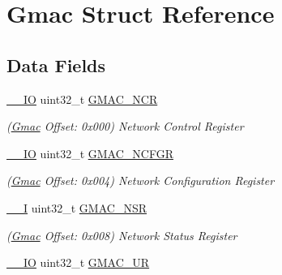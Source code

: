 \hypertarget{structGmac}{}\section{Gmac Struct Reference}
\label{structGmac}
\subsection*{Data Fields}
\begin{DoxyCompactItemize}
\item 
\mbox{\label{structGmac_af7956c00f79851e10a1012e6ebae02ec}} 
\mbox{\hyperlink{core__cm7_8h_aec43007d9998a0a0e01faede4133d6be}{\+\_\+\+\_\+\+IO}} uint32\+\_\+t \mbox{\hyperlink{structGmac_af7956c00f79851e10a1012e6ebae02ec}{G\+M\+A\+C\+\_\+\+N\+CR}}
\begin{DoxyCompactList}\small\item\em (\mbox{\hyperlink{structGmac}{Gmac}} Offset\+: 0x000) Network Control Register \end{DoxyCompactList}\item 
\mbox{\label{structGmac_a875e9ccd4b9608db23678b6bfaa70ade}} 
\mbox{\hyperlink{core__cm7_8h_aec43007d9998a0a0e01faede4133d6be}{\+\_\+\+\_\+\+IO}} uint32\+\_\+t \mbox{\hyperlink{structGmac_a875e9ccd4b9608db23678b6bfaa70ade}{G\+M\+A\+C\+\_\+\+N\+C\+F\+GR}}
\begin{DoxyCompactList}\small\item\em (\mbox{\hyperlink{structGmac}{Gmac}} Offset\+: 0x004) Network Configuration Register \end{DoxyCompactList}\item 
\mbox{\label{structGmac_a0354dce4f587ce5ad8b8ab5d0f3d16b8}} 
\mbox{\hyperlink{core__cm7_8h_af63697ed9952cc71e1225efe205f6cd3}{\+\_\+\+\_\+I}} uint32\+\_\+t \mbox{\hyperlink{structGmac_a0354dce4f587ce5ad8b8ab5d0f3d16b8}{G\+M\+A\+C\+\_\+\+N\+SR}}
\begin{DoxyCompactList}\small\item\em (\mbox{\hyperlink{structGmac}{Gmac}} Offset\+: 0x008) Network Status Register \end{DoxyCompactList}\item 
\mbox{\label{structGmac_a5a4ca6472c2d4795b6f1a1859a4e04fd}} 
\mbox{\hyperlink{core__cm7_8h_aec43007d9998a0a0e01faede4133d6be}{\+\_\+\+\_\+\+IO}} uint32\+\_\+t \mbox{\hyperlink{structGmac_a5a4ca6472c2d4795b6f1a1859a4e04fd}{G\+M\+A\+C\+\_\+\+UR}}

\end{DoxyCompactItemize}
